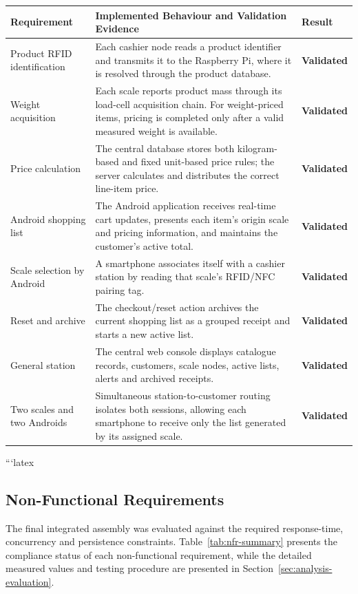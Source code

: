 \documentclass[11pt,a4paper]{article}
\newcommand{\statusvalidated}{\textcolor{wcgreen}{\textbf{Validated}}}
\begin{document}
\begin{tabularx}{\textwidth}{@{}p{}Y p{0.18\textwidth}@{}}
\toprule
\textbf{Requirement} & \textbf{Implemented Behaviour and Validation Evidence} & \textbf{Result} \\
\midrule
Product RFID identification & Each cashier node reads a product identifier and transmits it to the Raspberry Pi, where it is resolved through the product database. & \statusvalidated \\
Weight acquisition & Each scale reports product mass through its load-cell acquisition chain. For weight-priced items, pricing is completed only after a valid measured weight is available. & \statusvalidated \\
Price calculation & The central database stores both kilogram-based and fixed unit-based price rules; the server calculates and distributes the correct line-item price. & \statusvalidated \\
Android shopping list & The Android application receives real-time cart updates, presents each item's origin scale and pricing information, and maintains the customer's active total. & \statusvalidated \\
Scale selection by Android & A smartphone associates itself with a cashier station by reading that scale's RFID/NFC pairing tag. & \statusvalidated \\
Reset and archive & The checkout/reset action archives the current shopping list as a grouped receipt and starts a new active list. & \statusvalidated \\
General station & The central web console displays catalogue records, customers, scale nodes, active lists, alerts and archived receipts. & \statusvalidated \\
Two scales and two Androids & Simultaneous station-to-customer routing isolates both sessions, allowing each smartphone to receive only the list generated by its assigned scale. & \statusvalidated \\
\bottomrule
\end{tabularx}
```latex

\subsection{Non-Functional Requirements}

The final integrated assembly was evaluated against the required response-time, concurrency and persistence constraints. Table~\ref{tab:nfr-summary} presents the compliance status of each non-functional requirement, while the detailed measured values and testing procedure are presented in Section~\ref{sec:analysis-evaluation}.
\end{document}
